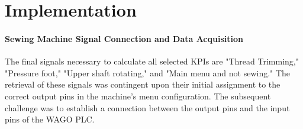 \clearpage
\chapter{\textbf{Implementation}}\label{Implementation}
\subsubsection{Sewing Machine Signal Connection and Data Acquisition}
The final signals necessary to calculate all selected KPIs are "Thread Trimming," "Pressure foot," "Upper shaft rotating," and "Main menu and not sewing." The retrieval of these signals was contingent upon their initial assignment to the correct output pins in the machine's menu configuration. The subsequent challenge was to establish a connection between the output pins and the input pins of the WAGO PLC.

